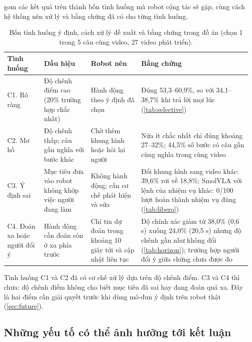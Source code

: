\documentclass[a4paper,oneside]{report}
\begin{document}
 gom các kết quả trên thành bốn tình huống mà robot cộng tác sẽ gặp, cùng cách hệ thống nên xử lý và bằng chứng đã có cho từng tình huống.

\begin{table}[ht]
\centering
\caption{Bốn tình huống ý định, cách xử lý đề xuất và bằng chứng trong đồ án (chọn 1 trong 5 câu cùng video, 27 video phát triển).}
\label{tab:cases}
\small
\begin{tabularx}{\linewidth}{>{\raggedright}p{2.3cm} >{\raggedright}p{3.4cm} >{\raggedright}p{2.9cm} >{\raggedright\arraybackslash}X}
\toprule
Tình huống & Dấu hiệu & Robot nên & Bằng chứng \\
\midrule
C1. Rõ ràng & Độ chênh điểm cao (20\% trường hợp chắc nhất) & Hành động theo ý định đã chọn & Đúng 53,3--60,9\%, so với 34,1--38,7\% khi trả lời mọi lúc (\cref{tab:selective}) \\
C2. Mơ hồ & Độ chênh thấp; câu gần nghĩa với bước khác & Chờ thêm khung hình hoặc hỏi lại người & Nửa ít chắc nhất chỉ đúng khoảng 27--32\%; 44,5\% số bước có câu gần cùng nghĩa trong cùng video \\
C3. Ý định sai & Mục tiêu đưa vào robot không khớp việc người đang làm & Không hành động; cần cơ chế phát hiện và sửa & Đổi khung hình sang video khác: 39,6\% rơi về 18,8\%; SmolVLA với lệnh của nhiệm vụ khác: 0/100 lượt hoàn thành nhiệm vụ đúng (\cref{tab:libero}) \\
C4. Đoán xa hoặc người đổi ý & Hành động cần đoán còn ở xa phía trước & Chỉ tin dự đoán trong khoảng 10 giây tới và cập nhật liên tục & Độ chính xác giảm từ 38,0\% (0,6 s) xuống 24,0\% (20,5 s) nhưng độ chênh gần như không đổi (\cref{tab:horizon}); trường hợp người đổi ý giữa chừng chưa được đo \\
\bottomrule
\end{tabularx}
\end{table}

Tình huống C1 và C2 đã có cơ chế xử lý dựa trên độ chênh điểm. C3 và C4 thì chưa: độ chênh điểm không cho biết mục tiêu đã sai hay đang đoán quá xa. Đây là hai điểm cần giải quyết trước khi dùng mô-đun ý định trên robot thật (\cref{sec:future}).

\subsection{Những yếu tố có thể ảnh hưởng tới kết luận}
\end{document}

